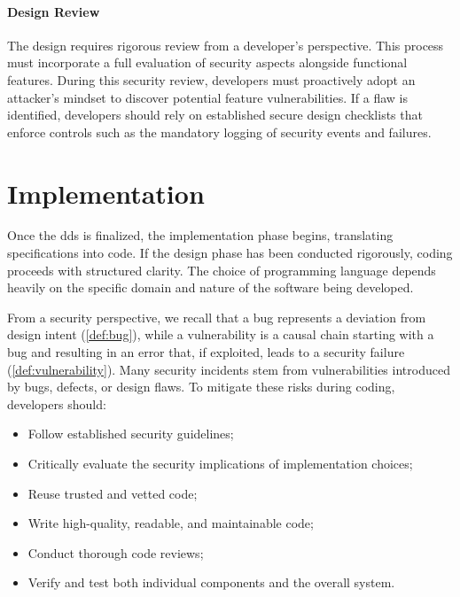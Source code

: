 \paragraph{Design Review} The design requires rigorous review from a developer's perspective. This process must incorporate a full evaluation of security aspects alongside functional features. During this security review, developers must proactively adopt an attacker's mindset to discover potential feature vulnerabilities. If a flaw is identified, developers should rely on established secure design checklists that enforce controls such as the mandatory logging of security events and failures.

\section{Implementation}
Once the \gls{dds} is finalized, the implementation phase begins, translating specifications into code. If the design phase has been conducted rigorously, coding proceeds with structured clarity. The choice of programming language depends heavily on the specific domain and nature of the software being developed.

\noindent From a security perspective, we recall that a bug represents a deviation from design intent (\cref{def:bug}), while a vulnerability is a causal chain starting with a bug and resulting in an error that, if exploited, leads to a security failure (\cref{def:vulnerability}). Many security incidents stem from vulnerabilities introduced by bugs, defects, or design flaws. To mitigate these risks during coding, developers should:
\begin{itemize}
    \item Follow established security guidelines;
    \item Critically evaluate the security implications of implementation choices;
    \item Reuse trusted and vetted code;
    \item Write high-quality, readable, and maintainable code;
    \item Conduct thorough code reviews;
    \item Verify and test both individual components and the overall system.
\end{itemize}

